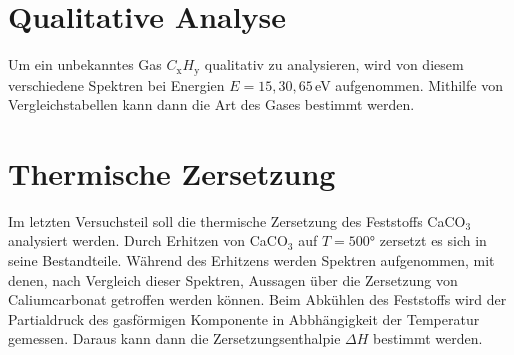 \section{Qualitative Analyse}
Um ein unbekanntes Gas $C_\text{x}H_\text{y}$ qualitativ zu analysieren, wird von diesem verschiedene Spektren bei Energien $E=15, 30, 65\,$eV aufgenommen. Mithilfe von Vergleichstabellen kann dann die Art des Gases bestimmt werden.

\section{Thermische Zersetzung}
Im letzten Versuchsteil soll die thermische Zersetzung des Feststoffs CaCO$_{3}$ analysiert werden. Durch Erhitzen von CaCO$_{3}$ auf $T=500$° zersetzt es sich in seine Bestandteile. Während des Erhitzens werden Spektren aufgenommen, mit denen, nach Vergleich dieser Spektren, Aussagen über die Zersetzung von Caliumcarbonat getroffen werden können. Beim Abkühlen des Feststoffs  wird der Partialdruck des gasförmigen Komponente in Abbhängigkeit der Temperatur gemessen. Daraus kann dann die Zersetzungsenthalpie $\Delta H$ bestimmt werden.
